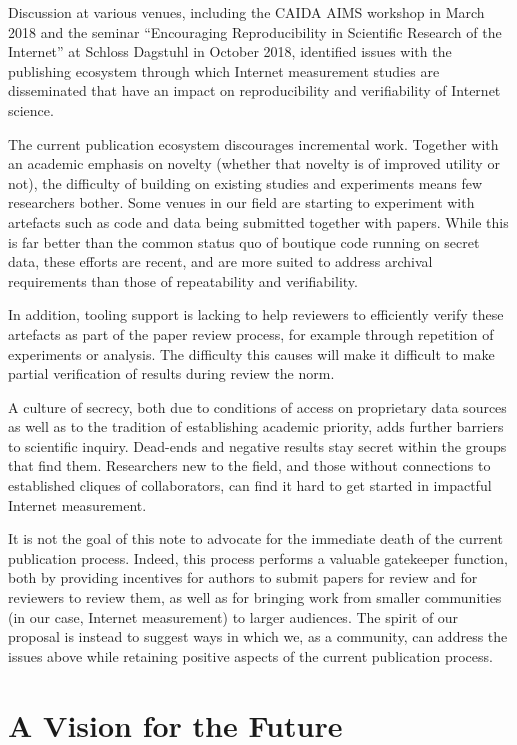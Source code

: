 \documentclass[sigconf]{acmart}
\begin{document}
Discussion at various venues, including the CAIDA AIMS workshop in March 2018
and the seminar  “Encouraging Reproducibility in Scientific Research of the
Internet” at Schloss Dagstuhl in October 2018, identified issues with the
publishing ecosystem through which Internet measurement studies are disseminated
that have an impact on reproducibility and verifiability of Internet science.

The current publication ecosystem discourages incremental work. Together with an
academic emphasis on novelty (whether that novelty is of improved utility or
not), the difficulty of building on existing studies and experiments means few
researchers bother. Some venues in our field are starting to experiment with
artefacts such as code and data being submitted together with papers. While this
is far better than the common status quo of boutique code running on secret
data, these efforts are recent, and are more suited to address archival
requirements than those of repeatability and verifiability. 

In addition, tooling support is lacking to help reviewers to efficiently verify
these artefacts as part of the paper review process, for example through
repetition of experiments or analysis. The difficulty this causes will make it
difficult to make partial verification of results during review the norm.

A culture of secrecy, both due to conditions of access on proprietary data
sources as well as to the tradition of establishing academic priority, adds
further barriers to scientific inquiry. Dead-ends and negative results stay
secret within the groups that find them. Researchers new to the field, and those
without connections to established cliques of collaborators, can find it hard to
get started in impactful Internet measurement. 

It is not the goal of this note to advocate for the immediate death of the
current publication process. Indeed, this process performs a valuable gatekeeper
function, both by providing incentives for authors to submit papers for review
and for reviewers to review them, as well as for bringing work from smaller
communities (in our case, Internet measurement) to larger audiences. The spirit
of our proposal is instead to suggest ways in which we, as a community, can
address the issues above while retaining positive aspects of the current
publication process.

\section{A Vision for the Future}\label{sec:vision}
\end{document}
